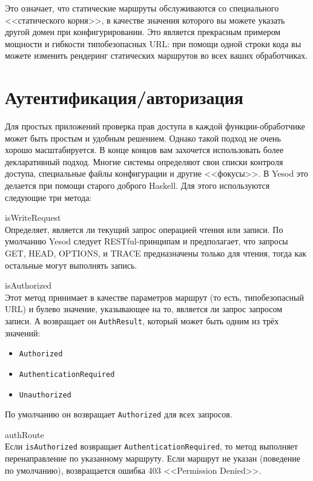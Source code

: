 Это означает, что статические маршруты обслуживаются со специального <<статического корня>>, в качестве значения которого вы можете указать другой домен при конфигурировании. Это является прекрасным примером мощности и гибкости типобезопасных URL: при помощи одной строки кода вы можете изменить рендеринг статических маршрутов во всех ваших обработчиках.

\section {Аутентификация/авторизация}

Для простых приложений проверка прав доступа в каждой функции-обработчике может быть простым и удобным решением. Однако такой подход не очень хорошо масштабируется. В конце концов вам захочется использовать более декларативный подход. Многие системы определяют свои списки контроля доступа, специальные файлы конфигурации и другие <<фокусы>>. В Yesod это делается при помощи старого доброго Haskell. Для этого используются следующие три метода:

\begin{description}
  \item {isWriteRequest} \hfill \\
    Определяет, является ли текущий запрос операцией чтения или записи. По умолчанию Yesod следует RESTful-принципам и предполагает, что запросы GET, HEAD, OPTIONS, и TRACE предназначены только для чтения, тогда как остальные могут выполнять запись.

  \item {isAuthorized} \hfill \\

    Этот метод принимает в качестве параметров маршрут (то есть, типобезопасный URL) и булево значение, указывающее на то, является ли запрос запросом записи. А возвращает он \lstinline!AuthResult!, который может быть одним из трёх значений:

    \begin{itemize}
      \item \lstinline!Authorized!
      \item \lstinline!AuthenticationRequired!
      \item \lstinline!Unauthorized!
    \end{itemize}

    По умолчанию он возвращает \lstinline!Authorized! для всех запросов.

  \item {authRoute} \hfill \\

    Если \lstinline!isAuthorized! возвращает \lstinline!AuthenticationRequired!, то метод выполняет перенаправление по указанному маршруту. Если маршрут не указан (поведение по умолчанию), возвращается ошибка 403 <<Permission Denied>>.

\end{description}

